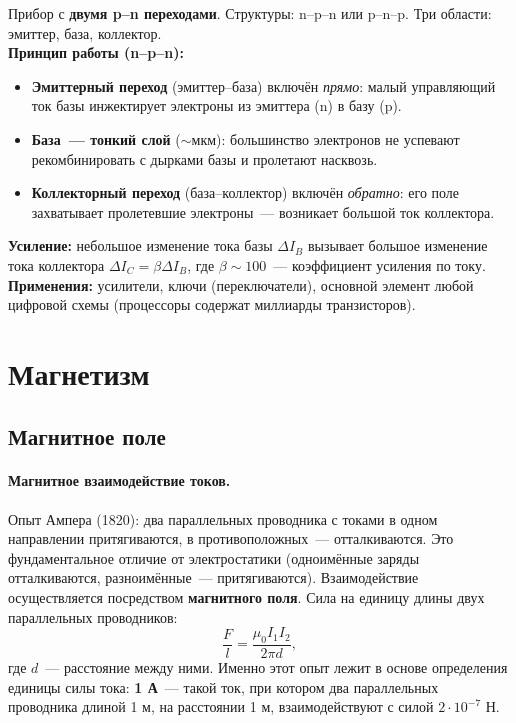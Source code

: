 \documentclass[12pt]{article}
\begin{document}
\begin{definition}[Транзистор]
	Прибор с \textbf{двумя p--n переходами}. Структуры: n--p--n или p--n--p. Три области: эмиттер, база, коллектор.\\
	\textbf{Принцип работы (n--p--n):}
	\begin{itemize}
		\item \textbf{Эмиттерный переход} (эмиттер--база) включён \textit{прямо}: малый управляющий ток базы инжектирует электроны из эмиттера (n) в базу (p).
		\item \textbf{База~--- тонкий слой} ($\sim$мкм): большинство электронов не успевают рекомбинировать с дырками базы и пролетают насквозь.
		\item \textbf{Коллекторный переход} (база--коллектор) включён \textit{обратно}: его поле захватывает пролетевшие электроны~--- возникает большой ток коллектора.
	\end{itemize}
	\textbf{Усиление:} небольшое изменение тока базы $\Delta I_B$ вызывает большое изменение тока коллектора $\Delta I_C = \beta \Delta I_B$, где $\beta \sim 100$~--- коэффициент усиления по току.\\
	\textbf{Применения:} усилители, ключи (переключатели), основной элемент любой цифровой схемы (процессоры содержат миллиарды транзисторов).
\end{definition}

\newpage
\section{Магнетизм}

\subsection{Магнитное поле}

\paragraph{Магнитное взаимодействие токов.}
Опыт Ампера (1820): два параллельных проводника с токами в одном направлении
притягиваются, в противоположных~--- отталкиваются. Это фундаментальное
отличие от электростатики (одноимённые заряды отталкиваются, разноимённые~---
притягиваются). Взаимодействие осуществляется посредством \textbf{магнитного
поля}. Сила на единицу длины двух параллельных проводников:
\[
    \frac{F}{l} = \frac{\mu_0 I_1 I_2}{2\pi d},
\]
где $d$~--- расстояние между ними. Именно этот опыт лежит в основе определения
единицы силы тока: \textbf{1 А}~--- такой ток, при котором два параллельных
проводника длиной 1 м, на расстоянии 1 м, взаимодействуют с силой
$2\cdot10^{-7}$ Н.
\end{document}
